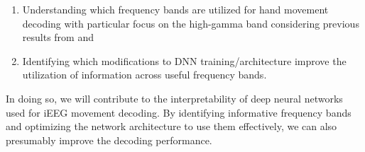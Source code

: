 \begin{enumerate}
    \item Understanding which frequency bands are utilized for hand movement decoding with particular focus on the high-gamma band considering previous results from \cite{Hammer-2021} and \cite{schirrmeister-deep-2017} 
    \item Identifying which modifications to DNN training/architecture improve the utilization of information across useful frequency bands.
\end{enumerate}


In doing so, we will contribute to the interpretability of deep neural networks used for iEEG movement decoding.
By identifying informative frequency bands and optimizing the network architecture to use them effectively, we can also presumably improve the decoding performance.

